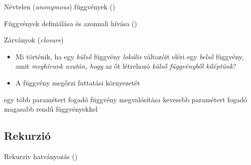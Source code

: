 \begin{frame}
    \begin{exampleblock}{Névtelen (\emph{anonymous}) függvények ()}
        
    \end{exampleblock}
\end{frame}

\begin{frame}
    \begin{exampleblock}{Függvények definiálása és azonnali hívása ()}
        
    \end{exampleblock}
\end{frame}

\begin{frame}
    Zárványok (\emph{closure})
    \begin{itemize}
        \item<1-> Mi történik, ha egy \emph{külső} függvény \emph{lokális} változóit eléri egy \emph{belső} függvény, amit \emph{meghívunk azután, hogy} az őt létrehozó \emph{külső függvényből kiléptünk}?
        \item<2-> A függvény megőrzi futtatási környezetét
    \end{itemize}
\end{frame}

\begin{frame}
    \begin{exampleblock}{ egy több paramétert fogadó függvény megvalósítása kevesebb paramétert fogadó magasabb rendű függvényekkel}
        \small
        \vspace{-.3cm}
        
        \vspace{-.3cm}
    \end{exampleblock}
\end{frame}

\subsection{Rekurzió}

\begin{frame}
    \begin{exampleblock}{Rekurzív hatványozás ()}
        \small
        
    \end{exampleblock}
\end{frame}

